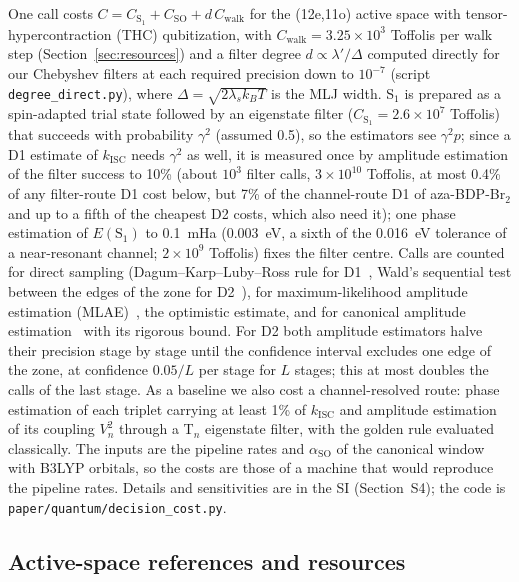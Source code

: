 \documentclass[journal=jctcce,manuscript=article]{achemso}
\newcommand{\kisc}{k_\mathrm{ISC}}
\newcommand{\aso}{\alpha_\mathrm{SO}}
\begin{document}
One call costs $C = C_{\mathrm{S}_1} + C_\mathrm{SO} + d\,C_\mathrm{walk}$ for the (12e,11o) active space
with tensor-hypercontraction (THC) qubitization, with $C_\mathrm{walk}=3.25\times10^{3}$ Toffolis per walk
step (Section~\ref{sec:resources}) and a filter degree $d\propto\lambda'/\Delta$ computed directly for our
Chebyshev filters at each required precision down to $10^{-7}$ (script \texttt{degree\_direct.py}), where $\Delta=\sqrt{2\lambda_sk_BT}$ is the MLJ width. S$_1$ is prepared as a spin-adapted trial state
followed by an eigenstate filter ($C_{\mathrm{S}_1}=2.6\times10^{7}$ Toffolis) that succeeds with probability
$\gamma^2$ (assumed 0.5), so the estimators see $\gamma^2p$; since a D1 estimate of $\kisc$ needs $\gamma^2$
as well, it is measured once by amplitude estimation of the filter success to 10\% (about $10^{3}$ filter calls,
$3\times10^{10}$ Toffolis, at most 0.4\% of any filter-route D1 cost below, but 7\% of the channel-route D1 of aza-BDP-Br$_2$ and up
to a fifth of the cheapest D2 costs, which also need it); one phase estimation of $E(\mathrm{S}_1)$ to
0.1~mHa (0.003~eV, a sixth of the 0.016~eV tolerance of a near-resonant channel; $2\times10^{9}$ Toffolis)
fixes the filter centre. Calls are counted for direct sampling (Dagum--Karp--Luby--Ross rule for
D1~\cite{Dagum2000}, Wald's sequential test between the edges of the zone for D2~\cite{Wald1945}), for
maximum-likelihood amplitude estimation (MLAE)~\cite{Suzuki2020}, the optimistic estimate, and for canonical
amplitude estimation~\cite{Brassard2002} with its rigorous bound. For D2 both amplitude estimators halve their
precision stage by stage until the confidence interval excludes one edge of the zone, at confidence $0.05/L$ per
stage for $L$ stages; this at most doubles the calls of the last stage. As a baseline we also cost a channel-resolved
route: phase estimation of each triplet carrying at least 1\% of $\kisc$ and amplitude estimation of its
coupling $V_n^2$ through a T$_n$ eigenstate filter, with the golden rule evaluated classically. The inputs
are the pipeline rates and $\aso$ of the canonical window with B3LYP orbitals, so the costs are those of a
machine that would reproduce the pipeline rates. Details and sensitivities are in the SI (Section~S4); the
code is \texttt{paper/quantum/decision\_cost.py}.

\subsection{Active-space references and resources}
\end{document}
